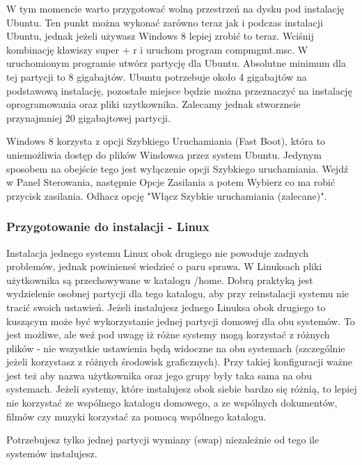 W tym momencie warto przygotować wolną przestrzeń na dysku pod instalację Ubuntu. Ten punkt można wykonać zarówno teraz jak i podczas instalacji Ubuntu, jednak jeżeli używasz Windows 8 lepiej zrobić to teraz. Wciśnij kombinację klawiszy super + r i uruchom program compmgmt.msc. W uruchomionym programie utwórz partycję dla Ubuntu. Absolutne minimum dla tej partycji to 8 gigabajtów. Ubuntu potrzebuje około 4 gigabajtów na podstawową instalację, pozostałe miejsce będzie można przeznaczyć na instalację oprogramowania oraz pliki uzytkownika. Zalecamy jednak stworzneie przynajmniej 20 gigabajtowej partycji.

Windows 8 korzysta z opcji Szybkiego Uruchamiania (Fast Boot), która to uniemożliwia dostęp do plików Windowsa przez system Ubuntu. Jedynym sposobem na obejście tego jest wyłączenie opcji Szybkiego uruchamiania. Wejdź w Panel Sterowania, następnie Opcje Zasilania a potem Wybierz co ma robić przycisk zasilania. Odhacz opcję "Włącz Szybkie uruchamiania (zalecane)".

\subsubsection{Przygotowanie do instalacji - Linux}
\label{sec:przygotowanie_linux}
Instalacja jednego systemu Linux obok drugiego nie powoduje zadnych problemów, jednak powinieneś wiedzieć o paru sprawa. W Linuksach pliki użytkownika są przechowywane w katalogu /home. Dobrą praktyką jest wydzielenie osobnej partycji dla tego katalogu, aby przy reinstalacji systemu nie tracić swoich ustawień. Jeżeli instalujesz jednego Linuksa obok drugiego to kuszącym może być wykorzystanie jednej partycji domowej dla obu systemów. 
To jest możliwe, ale weź pod uwagę iż różne systemy mogą korzystać z różnych plików - nie wszystkie ustawienia będą widoczne na obu systemach (szczególnie jeżeli korzystasz z różnych środowisk graficznych). Przy takiej konfiguracji ważne jest też aby nazwa użytkownika oraz jego grupy były taka sama na obu systemach.
Jeżeli systemy, które instalujesz obok siebie bardzo się różnią, to lepiej nie korzystać ze wspólnego katalogu domowego, a ze wspólnych dokumentów, filmów czy muzyki korzystać za pomocą wspólnego katalogu.

Potrzebujesz tylko jednej partycji wymiany (swap) niezależnie od tego ile systemów instalujesz.